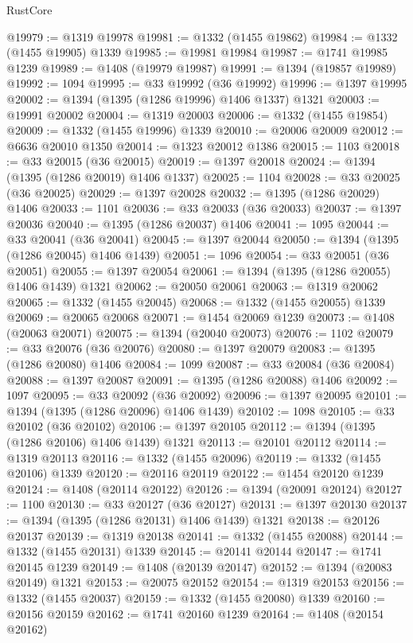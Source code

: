 \begin{lexlean}{RustCore}
\begin{coremodule}
@19979 := @1319 @19978
@19981 := @1332 (@1455 @19862)
@19984 := @1332 (@1455 @19905) @1339
@19985 := @19981 @19984
@19987 := @1741 @19985 @1239
@19989 := @1408 (@19979 @19987)
@19991 := @1394 (@19857 @19989)
@19992 := 1094
@19995 := @33 @19992 (@36 @19992)
@19996 := @1397 @19995
@20002 := @1394 (@1395 (@1286 @19996) @1406 @1337) @1321
@20003 := @19991 @20002
@20004 := @1319 @20003
@20006 := @1332 (@1455 @19854)
@20009 := @1332 (@1455 @19996) @1339
@20010 := @20006 @20009
@20012 := @6636 @20010 @1350
@20014 := @1323 @20012 @1386
@20015 := 1103
@20018 := @33 @20015 (@36 @20015)
@20019 := @1397 @20018
@20024 := @1394 (@1395 (@1286 @20019) @1406 @1337)
@20025 := 1104
@20028 := @33 @20025 (@36 @20025)
@20029 := @1397 @20028
@20032 := @1395 (@1286 @20029) @1406
@20033 := 1101
@20036 := @33 @20033 (@36 @20033)
@20037 := @1397 @20036
@20040 := @1395 (@1286 @20037) @1406
@20041 := 1095
@20044 := @33 @20041 (@36 @20041)
@20045 := @1397 @20044
@20050 := @1394 (@1395 (@1286 @20045) @1406 @1439)
@20051 := 1096
@20054 := @33 @20051 (@36 @20051)
@20055 := @1397 @20054
@20061 := @1394 (@1395 (@1286 @20055) @1406 @1439) @1321
@20062 := @20050 @20061
@20063 := @1319 @20062
@20065 := @1332 (@1455 @20045)
@20068 := @1332 (@1455 @20055) @1339
@20069 := @20065 @20068
@20071 := @1454 @20069 @1239
@20073 := @1408 (@20063 @20071)
@20075 := @1394 (@20040 @20073)
@20076 := 1102
@20079 := @33 @20076 (@36 @20076)
@20080 := @1397 @20079
@20083 := @1395 (@1286 @20080) @1406
@20084 := 1099
@20087 := @33 @20084 (@36 @20084)
@20088 := @1397 @20087
@20091 := @1395 (@1286 @20088) @1406
@20092 := 1097
@20095 := @33 @20092 (@36 @20092)
@20096 := @1397 @20095
@20101 := @1394 (@1395 (@1286 @20096) @1406 @1439)
@20102 := 1098
@20105 := @33 @20102 (@36 @20102)
@20106 := @1397 @20105
@20112 := @1394 (@1395 (@1286 @20106) @1406 @1439) @1321
@20113 := @20101 @20112
@20114 := @1319 @20113
@20116 := @1332 (@1455 @20096)
@20119 := @1332 (@1455 @20106) @1339
@20120 := @20116 @20119
@20122 := @1454 @20120 @1239
@20124 := @1408 (@20114 @20122)
@20126 := @1394 (@20091 @20124)
@20127 := 1100
@20130 := @33 @20127 (@36 @20127)
@20131 := @1397 @20130
@20137 := @1394 (@1395 (@1286 @20131) @1406 @1439) @1321
@20138 := @20126 @20137
@20139 := @1319 @20138
@20141 := @1332 (@1455 @20088)
@20144 := @1332 (@1455 @20131) @1339
@20145 := @20141 @20144
@20147 := @1741 @20145 @1239
@20149 := @1408 (@20139 @20147)
@20152 := @1394 (@20083 @20149) @1321
@20153 := @20075 @20152
@20154 := @1319 @20153
@20156 := @1332 (@1455 @20037)
@20159 := @1332 (@1455 @20080) @1339
@20160 := @20156 @20159
@20162 := @1741 @20160 @1239
@20164 := @1408 (@20154 @20162)

\end{coremodule}
\end{lexlean}
